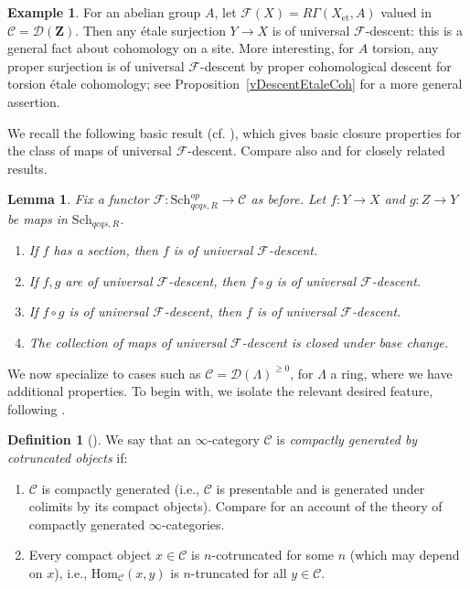 \documentclass[reqno]{amsart}
\newcommand{\et}{\mathrm{\acute{e}t}}
\renewcommand{\hom}{\mathrm{Hom}}
\newcommand{\D}{\mathcal{D}}
\newtheorem{lemma}[theorem]{Lemma}
\theoremstyle{definition}
\newtheorem{definition}[theorem]{Definition}
\newtheorem{example}[theorem]{Example}
\begin{document}
\begin{example}
For an abelian group $A$, let $\mathcal{F}(X) = R\Gamma(X_{\et},A)$ valued in $\mathcal{C} = \mathcal{D}(\mathbf{Z})$. Then any \'etale surjection $Y \to X$ is of universal $\mathcal{F}$-descent: this is a general fact about cohomology on a site. More interesting, for $A$ torsion, any proper surjection is of universal $\mathcal{F}$-descent by proper cohomological descent for torsion \'etale cohomology; see Proposition~\ref{vDescentEtaleCoh}  for a more general assertion.
\end{example}


We recall the following basic result (cf. \cite[Lemma 3.1.2]{LZ}), which gives
basic closure properties for the class of maps of universal $\mathcal{F}$-descent. 
Compare also 
\cite[10.10 and 10.11]{Gir64} and \cite[Vbis, 3.3.1]{SGA4} for closely related results. 

\begin{lemma} 
\label{Fsorite}
Fix a functor $\mathcal{F}\colon  \mathrm{Sch}_{qcqs,R}^{op} \to \mathcal{C}$ as before. 
Let $f\colon  Y \to X $ and $g\colon  Z \to Y$ be maps in $\mathrm{Sch}_{qcqs,R}$. \begin{enumerate}
\item If $f$ has a section, then $f$ is of universal $\mathcal{F}$-descent. 
\item  
If $f, g$ are of universal $\mathcal{F}$-descent, 
then $f \circ g$ is of universal $\mathcal{F}$-descent. 
\item  If $f \circ g$ is of universal $\mathcal{F}$-descent, then $f$ is of universal
$\mathcal{F}$-descent. 
\item The collection of maps of universal $\mathcal{F}$-descent is closed under
base change. 
\end{enumerate}
\end{lemma} 

We now specialize to cases such as $\mathcal{C} = \D( \Lambda)^{\geq 0}$,
for $\Lambda$ a ring, where we have additional properties. 
To begin with, we isolate the relevant desired feature, following \cite{EHIK}. 

\begin{definition}[{\cite[Def.~3.1.4]{EHIK}}]  
We say that an $\infty$-category $\mathcal{C}$ is
\emph{compactly generated by cotruncated objects} if: 
\begin{enumerate}
\item $\mathcal{C}$ is compactly generated 
(i.e., $\mathcal{C}$ is presentable and is generated under colimits by its compact objects). Compare
\cite[Sec.~5.5.7]{HTT} for an account of the theory of
compactly generated $\infty$-categories. 

\item 
Every compact object $x \in \mathcal{C}$ is $n$-cotruncated for some $n$
(which may depend on $x$), i.e.,  $\hom_{\mathcal{C}}(x, y)$ is $n$-truncated for all $y \in \mathcal{C}$. 
\end{enumerate}
\end{definition}
\end{document}
